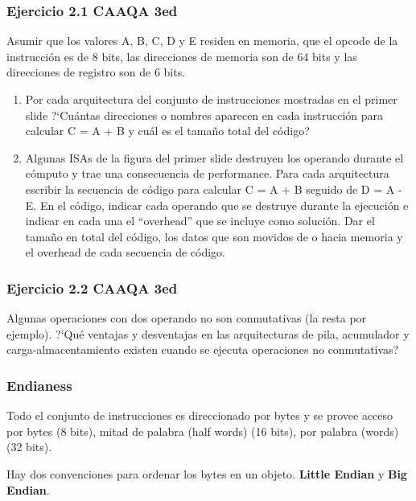 \documentclass{beamer}
\begin{document}
\begin{frame}
 \frametitle{Ejercicio 2.1 CAAQA 3ed}
 
Asumir que los valores A, B, C, D y E residen en memoria, que el opcode de la instrucción es de 8 bits, las direcciones de memoria son de 64 bits y las direcciones de registro son de 6 bits.

\begin{enumerate}[a]
 \item Por cada arquitectura del conjunto de instrucciones mostradas en el primer slide ?`Cuántas direcciones o nombres aparecen en cada instrucción para calcular  C = A + B y cuál es el tamaño total del código?

 \item Algunas ISAs de la figura del primer slide destruyen los operando durante el cómputo y trae una consecuencia de performance. Para cada arquitectura escribir la secuencia de código para calcular C = A + B seguido de D = A - E. En el código, indicar cada operando que se destruye durante la ejecución e indicar en cada una el “overhead”  que se incluye como solución. Dar el tamaño en total del código, los datos que son movidos de o hacia memoria y el overhead de cada secuencia de código.
\end{enumerate}
\end{frame}


\begin{frame}
 \frametitle{Ejercicio 2.2 CAAQA 3ed}
Algunas operaciones con dos operando no son conmutativas (la resta por ejemplo). ?`Qué ventajas y desventajas en las arquitecturas de pila, acumulador y carga-almacentamiento existen cuando se ejecuta operaciones no conmutativas?
\end{frame}


\begin{frame}
 \frametitle{Endianess}
Todo el conjunto de instrucciones es direccionado por bytes y se provee acceso por bytes (8 bits), mitad de palabra (half words) (16 bits), por palabra (words) (32 bits).

\bigskip

Hay dos convenciones para ordenar los bytes en un objeto. \textbf{Little Endian} y \textbf{Big Endian}.
 \end{frame}
 
\end{document}
